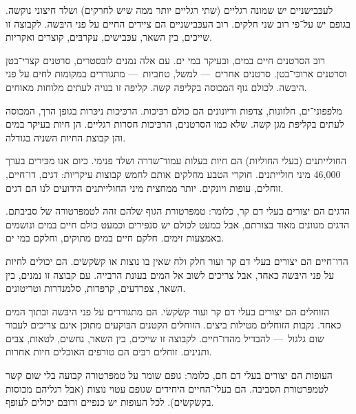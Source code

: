 לעכּבישניים יש שמונה רגליים (שתי רגליים יותר ממה שיש לחרקים) ושלד חיצוני נוקשה. בגופם יש על־פי רוב שני חלקים. רוב העכּבישניים הם ציידים החיים על פני היבּשה. לקבוצה זו שייכים, בין השאר, עכּבישים, עקרבּים, קוצרים ואקריות.



רוב הסרטנים חיים במים, ובעיקר במי ים. עם אלה נמנים לובּסטרים, סרטנים קצרי־בטן וסרטנים ארוכּי־בטן. סרטנים אחרים~— למשל, טחביות~— מתגוררים במקומות לחים על פני היבּשה. לכולם גוף המכוסה בקליפּה קשה. קליפּה זו בנויה לעתים מלוחות מאוחים.



מלפפוני־ים, חלזונות, צדפות ודיונונים הם כולם רכּיכות. הרכּיכות ניכּרות בגופן הרך, המכוסה לעתים בקליפּת מגן קשה. שלא כמו הסרטנים, הרכּיכות חסרות רגליים. הן חיות בעיקר במים והן קבוצת החיות השניה בגודלה.



החולייתנים (בעלי החוליות) הם חיות בעלות עמוד־שדרה ושלד פנימי. כיום אנו מכּירים בערך 46,000 מיני חולייתנים. חוקרי הטבע מחלקים אותם לחמש קבוצות עיקריות: דגים, דו־חיים, זוחלים, עופות ויונקים. יותר ממחצית מיני החולייתנים הידועים לנו הם דגים.



הדגים הם יצורים בעלי דם קר, כלומר: טמפּרטורת הגוף שלהם זהה לטמפּרטורה של סביבתם. הדגים מגוונים מאוד בצורתם, אבל כמעט לכולם יש סנפּירים וכמעט כולם חיים במים ונושמים באמצעות זימים. חלקם חיים במים מתוקים, וחלקם במי ים.



הדו־חיים הם יצורים בעלי דם קר ועור חלק ולח שאין בו נוצות או קשׂקשׂים. הם יכולים לחיות על פני היבּשה  כאחד, אבל צריכים לשוב אל המים בעונת הרבייה. עם קבוצה זו נמנים, בין השאר, צפרדעים, קרפּדות, סלמנדרות וטריטונים.



הזוחלים הם יצורים בעלי דם קר ועור קשׂקשׂי. הם מתגוררים על פני היבּשה ובתוך המים כאחד. נקבות הזוחלים מטילות ביצים. הזוחלים הקטנים הבּוקעים מתוכן אינם צריכים לעבור שום גלגול~— להבדיל מהדו־חיים. לקבוצה זו שייכים, בין השאר, נחשים, לטאות, צבּים ותנינים. זוחלים רבּים הם טורפים האוכלים חיות אחרות.



העופות הם יצורים בעלי דם חם, כלומר: גופם שומר על טמפּרטורה קבועה בלי שום קשר לטמפּרטורת הסביבה. הם בעלי־החיים היחידים שגופם עטוי נוצות (אבל רגליהם מכוסות בקשׂקשׂים). לכל העופות יש כנפיים ורובּם יכולים לעופף.


